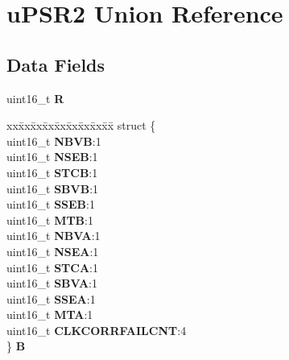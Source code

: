 \hypertarget{unionuPSR2}{}\section{u\+P\+S\+R2 Union Reference}
\label{unionuPSR2}
\subsection*{Data Fields}
\begin{DoxyCompactItemize}
\item 
\mbox{\label{unionuPSR2_a14daed0274352e243154c96ae0e7a96e}} 
uint16\+\_\+t {\bfseries R}
\item 
\mbox{\label{unionuPSR2_a5ccd968a61b0604c24fbb0206c428dc4}} 
\begin{tabbing}
xx\=xx\=xx\=xx\=xx\=xx\=xx\=xx\=xx\=\kill
struct \{\\
\>uint16\_t {\bfseries NBVB}:1\\
\>uint16\_t {\bfseries NSEB}:1\\
\>uint16\_t {\bfseries STCB}:1\\
\>uint16\_t {\bfseries SBVB}:1\\
\>uint16\_t {\bfseries SSEB}:1\\
\>uint16\_t {\bfseries MTB}:1\\
\>uint16\_t {\bfseries NBVA}:1\\
\>uint16\_t {\bfseries NSEA}:1\\
\>uint16\_t {\bfseries STCA}:1\\
\>uint16\_t {\bfseries SBVA}:1\\
\>uint16\_t {\bfseries SSEA}:1\\
\>uint16\_t {\bfseries MTA}:1\\
\>uint16\_t {\bfseries CLKCORRFAILCNT}:4\\
\} {\bfseries B}\\


\end{tabbing}
\end{DoxyCompactItemize}
